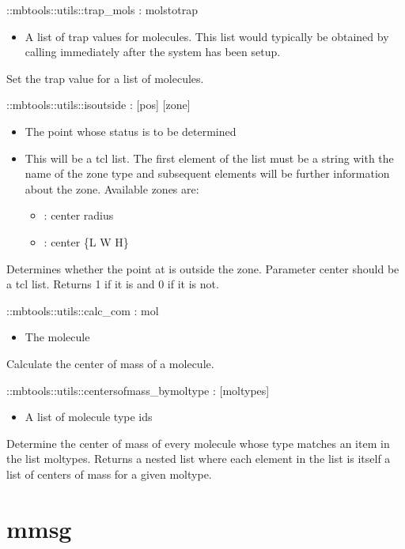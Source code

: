 \begin{code}    
  ::mbtools::utils::trap_mols  :  molstotrap
\end{code}
\begin{itemize}
          \item {} A list of trap values for molecules. This list would typically be obtained by calling  immediately after the system has been setup.
\end{itemize}
Set the trap value for a list of molecules.
\begin{code}    
  ::mbtools::utils::isoutside : [pos] [zone]
\end{code}
\begin{itemize}
  \item {} The point whose status is to be determined
  \item {} This will be a tcl list. The first element of the list must be a string with the name of the zone type and subsequent elements will be further information about the zone. Available zones are:
  \begin{itemize}
    \item {} : center radius
    \item {} : center \{L W H\}
  \end{itemize}
\end{itemize}
Determines whether the point at  is outside the zone. Parameter center should be a tcl list. Returns 1 if it is and 0 if it is not.
\begin{code}
  ::mbtools::utils::calc_com : mol
\end{code}
\begin{itemize}
          \item {} The molecule
\end{itemize}
Calculate the center of mass of a molecule.
\begin{code}    
  ::mbtools::utils::centersofmass_bymoltype : [moltypes]
\end{code}
\begin{itemize}
          \item {} A list of molecule type ids
\end{itemize}
Determine the center of mass of every molecule whose type matches an item in the list moltypes. Returns a nested list where each element in the list is itself a list of centers of mass for a given moltype.

\section{mmsg}


